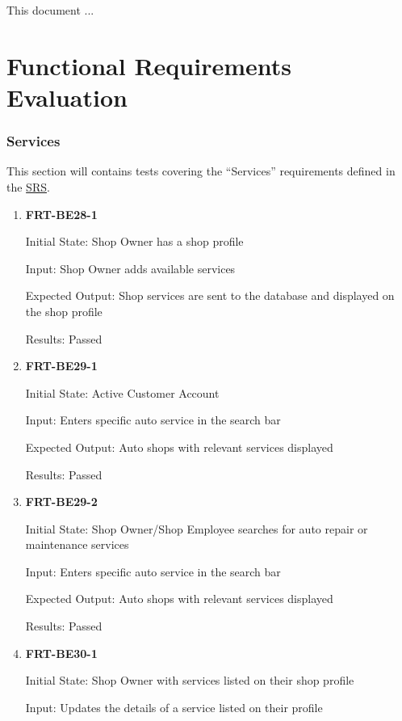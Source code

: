 \documentclass[12pt, titlepage]{article}
\begin{document}
This document ...

\section{Functional Requirements Evaluation}

\subsubsection{Services}

This section will contains tests covering the ``Services'' requirements defined in the
\href{https://github.com/arkinmodi/project-sayyara/blob/main/docs/SRS/SRS.pdf}{SRS}.

\begin{enumerate}

	\item \textbf{FRT-BE28-1}

	      Initial State: Shop Owner has a shop profile

	      Input: Shop Owner adds available services

	      Expected Output: Shop services are sent to the database and displayed on the shop profile

	      Results: Passed

	\item \textbf{FRT-BE29-1}

	      Initial State: Active Customer Account

	      Input: Enters specific auto service in the search bar

	      Expected Output: Auto shops with relevant services displayed

	      Results: Passed

	\item \textbf{FRT-BE29-2}

	      Initial State: Shop Owner/Shop Employee searches for auto repair or maintenance services

	      Input: Enters specific auto service in the search bar

	      Expected Output: Auto shops with relevant services displayed

	      Results: Passed

	\item \textbf{FRT-BE30-1}

	      Initial State: Shop Owner with services listed on their shop profile

	      Input: Updates the details of a service listed on their profile


\end{enumerate}
\end{document}
